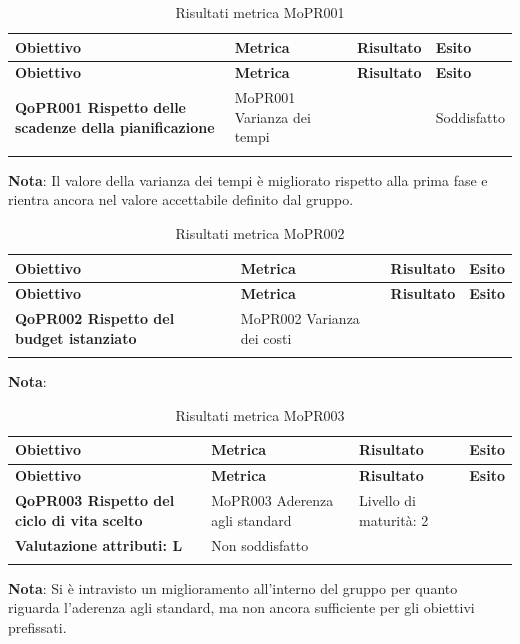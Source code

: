 \documentclass[../piano-di-qualifica.tex]{subfiles}
\begin{document}
\renewcommand{\arraystretch}{2} %
\begin{longtable}[H]{>{\centering\bfseries}m{5cm} >{\centering}m{5cm} >{\centering}m{2.5cm} >{\centering\arraybackslash}m{2.5cm}}  
  \rowcolor{lightgray}
  {\textbf{Obiettivo}} & {\textbf{Metrica}} & {\textbf{Risultato}} & {\textbf{Esito}}  \\
  \endfirsthead%
  \rowcolor{lightgray}
  {\textbf{Obiettivo}} & {\textbf{Metrica}} & {\textbf{Risultato}} & {\textbf{Esito}}  \\
  \endhead%
  \textbf{QoPR001 Rispetto delle scadenze della pianificazione} & MoPR001 Varianza dei tempi & 1.10  & Soddisfatto  \\
  \caption{Risultati metrica MoPR001}
  \label{tab:my-table}
\end{longtable}
\textbf{Nota}: Il valore della varianza dei tempi è migliorato rispetto alla prima fase e rientra ancora nel valore accettabile definito dal gruppo.

\renewcommand{\arraystretch}{2} %
\begin{longtable}[H]{>{\centering\bfseries}m{5cm} >{\centering}m{5cm} >{\centering}m{2.5cm} >{\centering\arraybackslash}m{2.5cm}}  
  \rowcolor{lightgray}
  {\textbf{Obiettivo}} & {\textbf{Metrica}} & {\textbf{Risultato}} & {\textbf{Esito}}  \\
  \endfirsthead%
  \rowcolor{lightgray}
  {\textbf{Obiettivo}} & {\textbf{Metrica}} & {\textbf{Risultato}} & {\textbf{Esito}}  \\
  \endhead%
  \textbf{QoPR002 Rispetto del budget istanziato} & MoPR002 Varianza dei costi &  &  \\
  \caption{Risultati metrica MoPR002}
  \label{tab:my-table}
\end{longtable}
\textbf{Nota}: 

\renewcommand{\arraystretch}{2} %
\begin{longtable}[H]{>{\centering\bfseries}m{5cm} >{\centering}m{5cm} >{\centering}m{2.5cm} >{\centering\arraybackslash}m{2.5cm}}  
  \rowcolor{lightgray}
  {\textbf{Obiettivo}} & {\textbf{Metrica}} & {\textbf{Risultato}} & {\textbf{Esito}}  \\
  \endfirsthead%
  \rowcolor{lightgray}
  {\textbf{Obiettivo}} & {\textbf{Metrica}} & {\textbf{Risultato}} & {\textbf{Esito}}  \\
  \endhead%
  \textbf{QoPR003 Rispetto del ciclo di vita scelto} & MoPR003 Aderenza agli standard & Livello di maturità:  2 \\ Valutazione attributi:  L &  Non soddisfatto \\
  \caption{Risultati metrica MoPR003}
  \label{tab:my-table}
\end{longtable}
\textbf{Nota}: Si è intravisto un miglioramento all'interno del gruppo per quanto riguarda l'aderenza agli standard, ma non ancora sufficiente per gli obiettivi prefissati.
\end{document}

